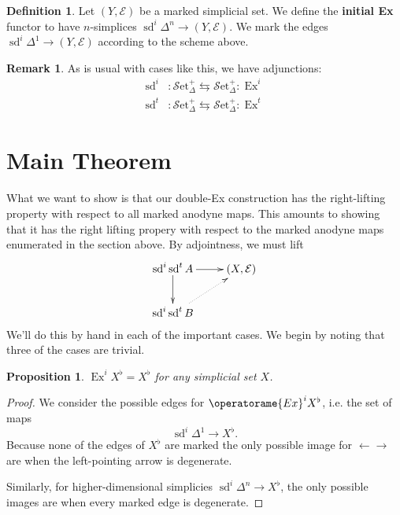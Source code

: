 \documentclass[english]{amsart}
\newcommand{\mc}{\mathcal}
\newcommand{\sset}{\mc{S}\text{et}_\Delta}
\newcommand{\Ex}{\operatorame{Ex}}
\newcommand{\sd}{\operatorname{sd}}
\newtheorem*{prop}{Proposition}
\theoremstyle{definition}
\newtheorem*{defn}{Definition}
\newtheorem*{rmk}{Remark}
\begin{document}
\begin{defn}
Let $(Y, \mc{E})$ be a marked simplicial set. We define the \textbf{initial Ex} functor to have $n$-simplices $\operatorname{sd}^i \Delta^n \to (Y,\mc{E})$. We mark the edges $\operatorname{sd}^i \Delta^1 \to (Y,\mc{E})$ according to the scheme above.  
\end{defn}

\begin{rmk}
As is usual with cases like this, we have adjunctions:
\begin{align*}
\operatorname{sd}^i &: \sset^+ \leftrightarrows \sset^+ : \operatorname{Ex}^i\\
\operatorname{sd}^t & : \sset^+ \leftrightarrows \sset^+ : \operatorname{Ex}^t
\end{align*}
\end{rmk}









\section{Main Theorem}

What we want to show is that our double-Ex construction has the right-lifting property with respect to all marked anodyne maps. This amounts to showing that it has the right lifting propery with respect to the marked anodyne maps enumerated in the section above. By adjointness, we must lift
\[
\xymatrix{
\operatorname{sd}^i \operatorname{sd}^t A \ar[r]\ar[d] & (X,\mc{E})\\
\operatorname{sd}^i \operatorname{sd}^t B \ar@{.>}[ur] & 
}
\]
We'll do this by hand in each of the important cases. We begin by noting that three of the cases are trivial. 

\begin{prop}
$\operatorname{Ex}^i X^\flat = X^\flat$ for any simplicial set $X$. 
\end{prop}
\begin{proof}
We consider the possible edges for $\Ex^i X^\flat$, i.e. the set of maps
\[
\sd^i \Delta^1 \to X^\flat. 
\]
Because none of the edges of $X^\flat$ are marked the only possible image for $\leftarrow \rightarrow$ are when the left-pointing arrow is degenerate. 

Similarly, for higher-dimensional simplicies $\sd^i \Delta^n \to X^\flat$, the only possible images are when every marked edge is degenerate. 
\end{proof}
\end{document}
